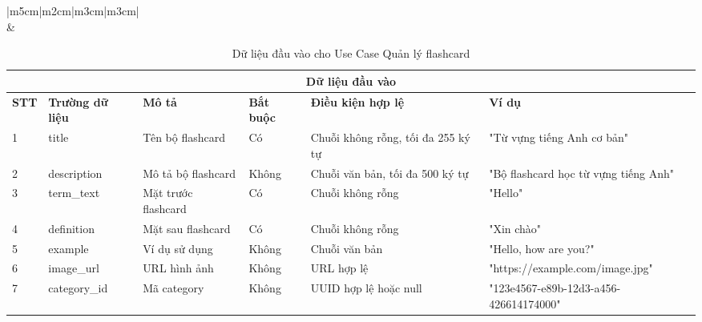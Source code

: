\documentclass[../DoAn.tex]{subfiles}
\begin{document}
\begin{table}[h!]
\begin{tabular}{|m{5cm}|m{2cm}|m{3cm}|m{3cm}|}
     \\
    \hline
     &  \\
    \hline
\end{tabular}
\caption{Thông tin chi tiết về Use Case Quản lý flashcard}
\end{table}

\vspace{0.5cm}

\begin{table}[h!]
\centering
\begin{tabular}{|m{1cm}|m{2.5cm}|m{3cm}|m{1cm}|m{2.5cm}|m{3.5cm}|}
    \hline
    \multicolumn{6}{|c|}{\textbf{Dữ liệu đầu vào}} \\
    \hline
    \textbf{STT} & \textbf{Trường dữ liệu} & \textbf{Mô tả} & \textbf{Bắt buộc} & \textbf{Điều kiện hợp lệ} & \textbf{Ví dụ} \\
    \hline
    1 & title & Tên bộ flashcard & Có & Chuỗi không rỗng, tối đa 255 ký tự & "Từ vựng tiếng Anh cơ bản" \\
    \hline
    2 & description & Mô tả bộ flashcard & Không & Chuỗi văn bản, tối đa 500 ký tự & "Bộ flashcard học từ vựng tiếng Anh" \\
    \hline
    3 & term\_text & Mặt trước flashcard & Có & Chuỗi không rỗng & "Hello" \\
    \hline
    4 & definition & Mặt sau flashcard & Có & Chuỗi không rỗng & "Xin chào" \\
    \hline
    5 & example & Ví dụ sử dụng & Không & Chuỗi văn bản & "Hello, how are you?" \\
    \hline
    6 & image\_url & URL hình ảnh & Không & URL hợp lệ & "https://example.com/image.jpg" \\
    \hline
    7 & category\_id & Mã category & Không & UUID hợp lệ hoặc null & "123e4567-e89b-12d3-a456-426614174000" \\
    \hline
\end{tabular}
\caption{Dữ liệu đầu vào cho Use Case Quản lý flashcard}
\end{table}
\end{document}
